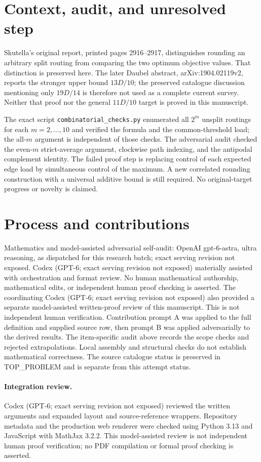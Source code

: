 \documentclass[11pt]{article}
\begin{document}
\section{Context, audit, and unresolved step}
Skutella's original report, printed pages 2916--2917, distinguishes rounding
an arbitrary split routing from comparing the two optimum objective values.
That distinction is preserved here. The later Daubel abstract,
arXiv:1904.02119v2, reports the stronger upper bound $13D/10$; the preserved
catalogue discussion mentioning only $19D/14$ is therefore not used as a
complete current survey. Neither that proof nor the general $11D/10$ target
is proved in this manuscript.

The exact script \texttt{combinatorial\_checks.py} enumerated all $2^m$
unsplit routings for each $m=2,\ldots,10$ and verified the formula and the
common-threshold load; the all-$m$ argument is independent of those checks.
The adversarial audit checked the even-$m$ strict-average argument, clockwise
path indexing, and the antipodal complement identity. The failed proof step
is replacing control of each expected edge load by simultaneous control of
the maximum. A new correlated rounding construction with a universal additive
bound is still required. No original-target progress or novelty is claimed.

\section{Process and contributions}
Mathematics and model-assisted adversarial self-audit: OpenAI gpt-6-astra, ultra reasoning, as dispatched for this research batch; exact serving revision not exposed. Codex (GPT-6; exact serving revision not exposed) materially assisted with orchestration and format review. No human mathematical authorship, mathematical edits, or independent human proof checking is asserted.
The coordinating Codex (GPT-6; exact serving revision not exposed) also provided a separate model-assisted written-proof review of this manuscript. This is not independent human verification.
Contribution prompt A was applied to the full definition and supplied source row, then prompt B was applied adversarially to the derived results. The item-specific audit above records the scope checks and rejected extrapolations. Local assembly and structural checks do not establish mathematical correctness. The source catalogue status is preserved in TOP\_PROBLEM and is separate from this attempt status.
\paragraph{Integration review.} Codex (GPT-6; exact serving revision not exposed) reviewed the written arguments and expanded layout and source-reference wrappers. Repository metadata and the production web renderer were checked using Python 3.13 and JavaScript with MathJax 3.2.2. This model-assisted review is not independent human proof verification; no PDF compilation or formal proof checking is asserted.
\end{document}
